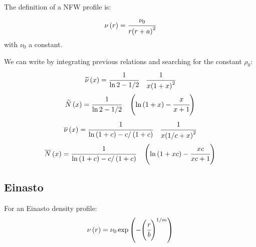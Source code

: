 \subsection{\citet{NFW+97}}

The definition of a NFW profile is:
%
\begin{equation}
    \nu \left(r\right) = \cfrac{\nu_0}{r {\left(r+a\right)}^2}
\end{equation}
%
with $\nu_0$ a constant.

We can write by integrating previous relations and searching for the
constant $\rho_0$:
%
\begin{equation}
    \widetilde\nu\left(x\right)=\cfrac{1}{\ln2-1/2}
        \quad\cfrac{1}{x{\left(1+x\right)}^2}
\end{equation}
%
\begin{equation}
    \widetilde{N}\left(x\right)=\cfrac{1}{\ln2-1/2}
        \quad\left(\ln\left(1+x\right)-\cfrac{x}{x+1}\right)
\end{equation}
%
\begin{equation}
    \overline\nu\left(x\right)=
        \cfrac{1}{\ln\left(1+c\right)-c/ \left(1+c\right)}
        \quad\cfrac{1}{x{\left(1/c+x\right)}^2}
\end{equation}
%
\begin{equation}
    \overline{N}\left(x\right)=
        \cfrac{1}{\ln \left(1+c\right)-c/ \left(1+c\right)}
        \quad\left(\ln\left(1+xc\right)-\cfrac{xc}{xc+1}\right)
\end{equation}

\subsection{Einasto}
\label{sub:einasto}

For an Einasto density profile:
\begin{equation}
    \nu \left(r\right) = \nu_0 \exp
    \left(- {\left(\cfrac{r}{b}\right)}^{1/m}\right)
\end{equation}

